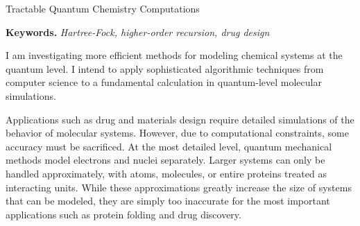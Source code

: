 \documentclass[twoside,leqno, 12pt]{article}
\date{}
\begin{document}
\begin{center}
\Large{Tractable Quantum Chemistry Computations}
\end{center}
\vspace{-0.15in}
\textbf{Keywords.}  \textit{Hartree-Fock, higher-order recursion, drug design}






I am investigating more efficient methods for modeling chemical systems at the quantum level.  I intend to apply sophisticated algorithmic techniques from computer science to a fundamental calculation in quantum-level molecular simulations.

Applications such as drug and materials design require detailed simulations of the behavior of molecular systems.  However, due to computational constraints, some accuracy must be sacrificed.  
At the most detailed level, quantum mechanical methods model electrons and nuclei separately.  Larger systems can only be handled approximately, with atoms, molecules, or entire proteins treated as interacting units.  While these approximations greatly increase the size of systems that can be modeled, they are simply too inaccurate for the most important applications such as protein folding and drug discovery.   
\end{document}
